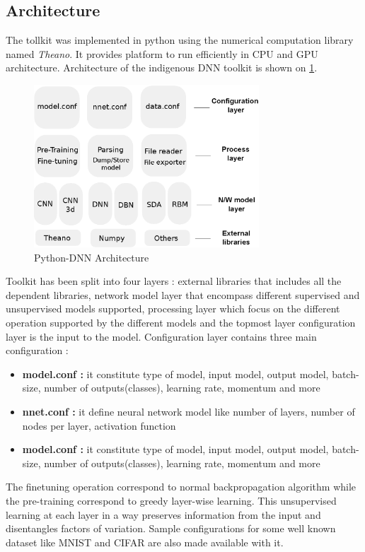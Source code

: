 \subsection{Architecture}
The tollkit was implemented in python using the numerical computation library named \textit{Theano}. It provides platform to run efficiently in CPU and GPU architecture.
Architecture of the indigenous DNN toolkit is shown on \ref{fig:architecture}.
\begin{figure}[htpb]
   \begin{center}
	    \includegraphics[width=0.75\textwidth]{snaps/architecture.eps}     
     \caption {Python-DNN Architecture}
	 \label{fig:architecture}
   \end{center}
 \end{figure}
 Toolkit has been split into four layers : external libraries that includes all the dependent libraries, network model layer that encompass different supervised and unsupervised models supported,  processing layer which focus on the different operation supported by the different models and  the topmost layer configuration layer is the input to the model. Configuration layer contains three main configuration : 
 \begin{itemize}
	\item {\textbf{model.conf :} it constitute type of model, input model, output model, batch-size, number of outputs(classes), learning rate, momentum and more}
	\item {\textbf{nnet.conf :} it define neural network model like number of layers, number of nodes per layer, activation function}
	\item {\textbf{model.conf :} it constitute type of model, input model, output model, batch-size, number of outputs(classes), learning rate, momentum and more}
 \end{itemize}
The finetuning operation  correspond to normal backpropagation algorithm while the pre-training correspond to greedy layer-wise learning. This unsupervised learning at each layer in a way preserves information from the input and disentangles factors of variation. Sample configurations for some well known dataset like MNIST and CIFAR are also made available with it.
